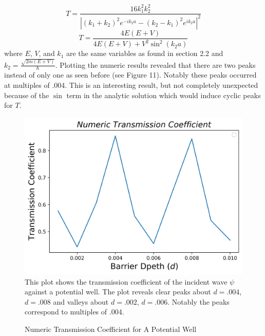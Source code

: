 \documentclass[twocolumn]{article}
\begin{document}
\begin{equation}
	T=\frac{16k_1^2k_2^2}{\left| (k_1+k_2)^2e^{-ik_2a}-(k_2-k_1)^2e^{ik_2a} \right|^2}
\end{equation}
\begin{equation}
	T=\frac{4E(E+V)}{4E(E+V)+V^2\sin^2(k_2a)}
\end{equation}
where $E$, $V$, and $k_1$ are the same variables as found in section 2.2 and $k_2=\frac{\sqrt{2m(E+V)}}{\hbar}$. Plotting the numeric results revealed that there are two peaks instead of only one as seen before (see Figure 11). Notably these peaks occurred at multiples of .004. This is an interesting result, but not completely unexpected because of the $\sin$ term in the analytic solution which would induce cyclic peaks for $T$.
\begin{figure}[hb]
\centering
\caption{Numeric Transmission Coefficient for A Potential Well}
\includegraphics[scale=.5]{T_numericD}
\small{This plot shows the transmission coefficient of the incident wave $\psi$ against a potential well. The plot reveals clear peaks about $d=.004$, $d=.008$ and valleys about $d=.002$, $d=.006$. Notably the peaks correspond to multiples of .004.}
\end{figure}
\end{document}
